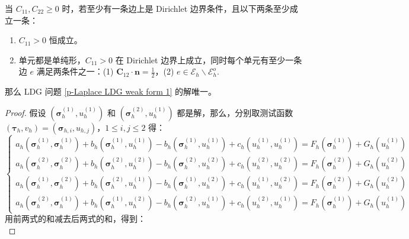 \begin{theorem}[Uniqueness]
	当 \(C_{11}, C_{22} \geqslant 0\) 时，若至少有一条边上是 Dirichlet 边界条件，且以下两条至少成立一条：
	\begin{enumerate}
		\item \(C_{11} > 0\) 恒成立。
		\item 单元都是单纯形，\(C_{11} > 0\) 在 Dirichlet 边界上成立，同时每个单元有至少一条边 \(e\) 满足两条件之一：(1) \(\bm C_{12}\cdot\bm n = \frac{1}{2}\)，(2) \(e\in\mathcal{E}_{h}\backslash\mathcal{E}_{h}^{o}\).
	\end{enumerate}
	那么 LDG 问题 \eqref{p-Laplace LDG weak form 1} 的解唯一。

	\begin{proof}
		假设 \(\left(\bm\sigma_{h}^{(1)}, u_{h}^{(1)}\right)\) 和 \(\left(\bm\sigma_{h}^{(2)}, u_{h}^{(1)}\right)\) 都是解，那么，分别取测试函数 \(\left(\bm\tau_{h}, v_{h}\right) = \left(\bm\sigma_{h,i}, u_{h, j}\right)\)，\(1 \leqslant i,j \leqslant 2\) 得：
		\begin{equation*}
			\begin{cases}
				a_{h}\left(\bm\sigma_{h}^{(1)}, \bm\sigma_{h}^{(1)}\right) + b_{h}\left(\bm\sigma_{h}^{(1)}, u_{h}^{(1)}\right) - b_{h}\left(\bm\sigma_{h}^{(1)}, u_{h}^{(1)}\right) + c_{h}\left(u_{h}^{(1)}, u_{h}^{(1)}\right) = F_{h}\left(\bm\sigma_{h}^{(1)}\right) + G_{h}\left(u_{h}^{(1)}\right) \\
				a_{h}\left(\bm\sigma_{h}^{(2)}, \bm\sigma_{h}^{(2)}\right) + b_{h}\left(\bm\sigma_{h}^{(2)}, u_{h}^{(2)}\right) - b_{h}\left(\bm\sigma_{h}^{(2)}, u_{h}^{(2)}\right) + c_{h}\left(u_{h}^{(2)}, u_{h}^{(2)}\right) = F_{h}\left(\bm\sigma_{h}^{(2)}\right) + G_{h}\left(u_{h}^{(2)}\right) \\
				a_{h}\left(\bm\sigma_{h}^{(1)}, \bm\sigma_{h}^{(2)}\right) + b_{h}\left(\bm\sigma_{h}^{(2)}, u_{h}^{(1)}\right) - b_{h}\left(\bm\sigma_{h}^{(1)}, u_{h}^{(2)}\right) + c_{h}\left(u_{h}^{(1)}, u_{h}^{(2)}\right) = F_{h}\left(\bm\sigma_{h}^{(2)}\right) + G_{h}\left(u_{h}^{(2)}\right) \\
				a_{h}\left(\bm\sigma_{h}^{(2)}, \bm\sigma_{h}^{(1)}\right) + b_{h}\left(\bm\sigma_{h}^{(1)}, u_{h}^{(2)}\right) - b_{h}\left(\bm\sigma_{h}^{(2)}, u_{h}^{(1)}\right) + c_{h}\left(u_{h}^{(2)}, u_{h}^{(1)}\right) = F_{h}\left(\bm\sigma_{h}^{(1)}\right) + G_{h}\left(u_{h}^{(1)}\right)
			\end{cases}
		\end{equation*}
		用前两式的和减去后两式的和，得到：
		\begin{equation*}

\end{equation*}
\end{proof}
\end{theorem}
